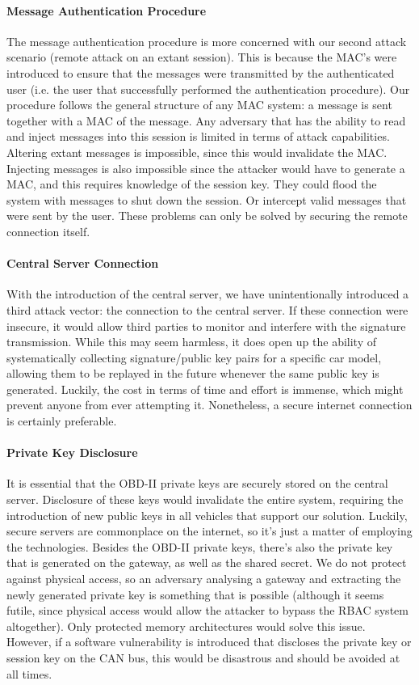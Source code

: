 \paragraph{Message Authentication Procedure}
The message authentication procedure is more concerned with our second attack scenario (remote attack on an extant session). This is because the MAC's were introduced to ensure that the messages were transmitted by the authenticated user (i.e. the user that successfully performed the authentication procedure). Our procedure follows the general structure of any MAC system: a message is sent together with a MAC of the message. Any adversary that has the ability to read and inject messages into this session is limited in terms of attack capabilities. Altering extant messages is impossible, since this would invalidate the MAC. Injecting messages is also impossible since the attacker would have to generate a MAC, and this requires knowledge of the session key. They could flood the system with messages to shut down the session. Or intercept valid messages that were sent by the user. These problems can only be solved by securing the remote connection itself.  

\paragraph{Central Server Connection} With the introduction of the central server, we have unintentionally introduced a third attack vector: the connection to the central server. If these connection were insecure, it would allow third parties to monitor and interfere with the signature transmission. While this may seem harmless, it does open up the ability of systematically collecting signature/public key pairs for a specific car model, allowing them to be replayed in the future whenever the same public key is generated. Luckily, the cost in terms of time and effort is immense, which might prevent anyone from ever attempting it. Nonetheless, a secure internet connection is certainly preferable.

\paragraph{Private Key Disclosure} It is essential that the OBD-II private keys are securely stored on the central server. Disclosure of these keys would invalidate the entire system, requiring the introduction of new public keys in all vehicles that support our solution. Luckily, secure servers are commonplace on the internet, so it's just a matter of employing the technologies. Besides the OBD-II private keys, there's also the private key that is generated on the gateway, as well as the shared secret. We do not protect against physical access, so an adversary analysing a gateway and extracting the newly generated private key is something that is possible (although it seems futile, since physical access would allow the attacker to bypass the RBAC system altogether). Only protected memory architectures would solve this issue. However, if a software vulnerability is introduced that discloses the private key or session key on the CAN bus, this would be disastrous and should be avoided at all times.

